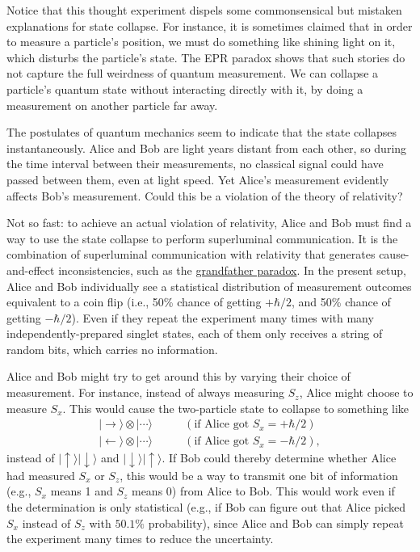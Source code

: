 \documentclass[prx,12pt]{revtex4-2}
\begin{document}
Notice that this thought experiment dispels some commonsensical but
mistaken explanations for state collapse.  For instance, it is
sometimes claimed that in order to measure a particle's position, we
must do something like shining light on it, which disturbs the
particle's state.  The EPR paradox shows that such stories do not
capture the full weirdness of quantum measurement.  We can collapse a
particle's quantum state without interacting directly with it, by
doing a measurement on another particle far away.

The postulates of quantum mechanics seem to indicate that the state
collapses instantaneously.  Alice and Bob are light years distant from
each other, so during the time interval between their measurements, no
classical signal could have passed between them, even at light speed.
Yet Alice's measurement evidently affects Bob's measurement.  Could
this be a violation of the theory of relativity?

Not so fast: to achieve an actual violation of relativity, Alice and
Bob must find a way to use the state collapse to perform superluminal
communication.  It is the combination of superluminal communication
with relativity that generates cause-and-effect inconsistencies, such
as the
\href{https://en.wikipedia.org/wiki/Temporal_paradox#Grandfather_paradox}{grandfather
  paradox}.  In the present setup, Alice and Bob individually see a
statistical distribution of measurement outcomes equivalent to a coin
flip (i.e., 50\% chance of getting $+\hbar/2$, and 50\% chance of
getting $-\hbar/2$).  Even if they repeat the experiment many times
with many independently-prepared singlet states, each of them only
receives a string of random bits, which carries no information.

Alice and Bob might try to get around this by varying their choice of
measurement.  For instance, instead of always measuring $S_z$, Alice
might choose to measure $S_x$.  This would cause the two-particle
state to collapse to something like
\begin{align*}
  |\!\rightarrow\rangle \otimes |\cdots\rangle &\qquad(\textrm{if Alice got $S_x = +\hbar/2$}) \\
  |\!\leftarrow\rangle \otimes |\cdots\rangle &\qquad(\textrm{if Alice got $S_x = -\hbar/2$}),
\end{align*}
instead of $|\!\uparrow\rangle |\!\downarrow\rangle$ and
$|\!\downarrow\rangle |\!\uparrow\rangle$.  If Bob could thereby
determine whether Alice had measured $S_x$ or $S_z$, this would be a
way to transmit one bit of information (e.g., $S_x$ means 1 and $S_z$
means 0) from Alice to Bob.  This would work even if the determination
is only statistical (e.g., if Bob can figure out that Alice picked
$S_x$ instead of $S_z$ with $50.1\%$ probability), since Alice and Bob
can simply repeat the experiment many times to reduce the uncertainty.
\end{document}

